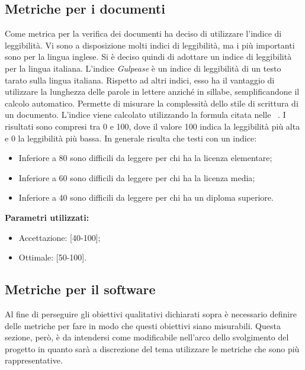 \subsection{Metriche per i documenti}
Come metrica per la verifica dei documenti \gruppo ha deciso di utilizzare l’indice di leggibilità.
Vi sono a disposizione molti indici di leggibilità, ma i più importanti sono per la lingua inglese. Si è deciso quindi di adottare un indice di leggibilità per la lingua italiana.
L’indice \textit{Gulpease} è un indice di leggibilità di un testo tarato sulla lingua italiana. Rispetto ad altri indici, esso ha il vantaggio di utilizzare la lunghezza delle parole in lettere anziché in sillabe, semplificandone il calcolo automatico. Permette di misurare la complessità dello stile di scrittura di un documento.
L’indice viene calcolato utilizzando la formula citata nelle \infoNDP~.
I risultati sono compresi tra 0 e 100, dove il valore 100 indica la leggibilità più alta e 0 la leggibilità più bassa. In generale risulta che testi con un indice:
\begin{itemize}
\item Inferiore a 80 sono difficili da leggere per chi ha la licenza elementare;
\item Inferiore a 60 sono difficili da leggere per chi ha la licenza media;
\item Inferiore a 40 sono difficili da leggere per chi ha un diploma superiore.
\end{itemize}
\textbf{Parametri utilizzati:}
\begin{itemize}
\item Accettazione: [40-100];
\item Ottimale: [50-100].
\end{itemize}
\subsection{Metriche per il software}
Al fine di perseguire gli obiettivi qualitativi dichiarati sopra è necessario definire delle metriche per fare in modo che questi obiettivi siano misurabili. Questa sezione, però, è da intendersi come modificabile nell'arco dello svolgimento del progetto in quanto sarà a discrezione del tema utilizzare le metriche che sono più rappresentative.
